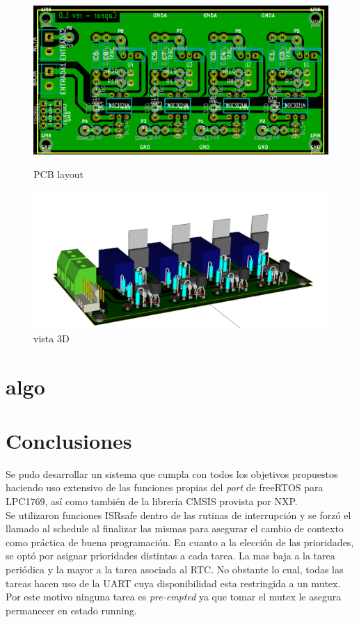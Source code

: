 \documentclass[a4paper,12pt]{article}
\begin{document}
\begin{figure}[ht]
	\begin{minipage}[b]{0.45\linewidth}
		\centering
		\includegraphics[width=\textwidth]{./imagenes/potencia-PCB.png}
		\caption{PCB layout}
		\label{fig:figure1}
	\end{minipage}
	\hspace{0.5cm}
	\begin{minipage}[b]{0.45\linewidth}
		\centering
		\includegraphics[width=\textwidth]{./imagenes/potencia-3D.png}
		\caption{vista 3D}
		\label{fig:figure2}
	\end{minipage}
\end{figure}


\section{algo}
\section{Conclusiones}
Se pudo desarrollar un sistema que cumpla con todos los objetivos propuestos haciendo uso extensivo de las funciones propias del {\textit{port}} de freeRTOS para LPC1769, así como también de la librería CMSIS provista por NXP.\\
Se utilizaron funciones ISRsafe dentro de las rutinas de interrupción y se forzó el llamado al schedule al finalizar las mismas para asegurar el cambio de contexto como práctica de buena programación.
En cuanto a la elección de las prioridades, se optó por asignar prioridades distintas a cada tarea. La mas baja a la tarea periódica y la mayor a la tarea asociada al RTC.  No obstante lo cual, todas las tareas hacen uso de la UART cuya disponibilidad esta restringida a un mutex.  Por este motivo ninguna tarea es {\textit{pre-empted}} ya que tomar el mutex le asegura permanecer en estado running.
\end{document}
